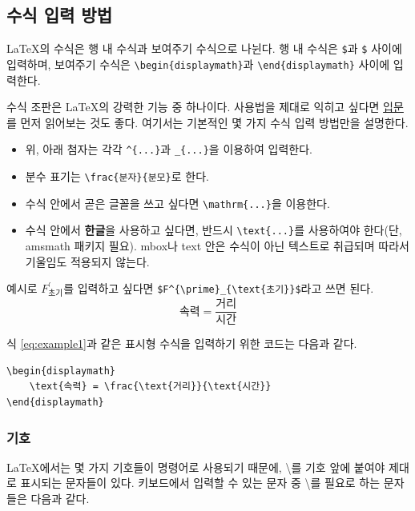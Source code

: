 \documentclass[11pt]{article}
\newcommand{\lshort}{%
	\href{http://texdoc.net/texmf-dist/doc/latex/%
		lshort-korean/lshort-kr.pdf%
	}{\LaTeXe 입문}%
}
\begin{document}
\subsection{수식 입력 방법}
\LaTeX 의 수식은 행 내 수식과 보여주기 수식으로 나뉜다. 행 내 수식은 \verb|$|과 
\verb|$| 사이에 입력하며, 보여주기 수식은 
\verb|\begin{displaymath}|과 \verb|\end{displaymath}| 사이에 입력한다.

수식 조판은 \LaTeX 의 강력한 기능 중 하나이다. 사용법을 제대로 익히고 싶다면 
\lshort 를 먼저 읽어보는 것도 좋다.
여기서는 기본적인 몇 가지 수식 입력 방법만을 설명한다.

\begin{itemize}
	\item 위, 아래 첨자는 각각 \verb|^{...}|과 \verb|_{...}|을 이용하여 
	입력한다.
	\item 분수 표기는 \verb|\frac{분자}{분모}|로 한다.
	\item 수식 안에서 곧은 글꼴을 쓰고 싶다면 \verb|\mathrm{...}|을 
	이용한다.
	\item 수식 안에서 {\bf 한글}을 사용하고 싶다면, 반드시 
	\verb|\text{...}|를 사용하여야 한다(단, amsmath 패키지 필요). mbox나 
	text 안은 수식이 아닌 텍스트로 취급되며 따라서 
	기울임도 적용되지 않는다.
\end{itemize}

예시로 $F^{\prime}_{\text{초기}}$를 입력하고 싶다면 
\verb|$F^{\prime}_{\text{초기}}$|라고 쓰면 된다.
\begin{equation} \label{eq:example1}
	\text{속력} = \frac{\text{거리}}{\text{시간}}
\end{equation}

식 \ref{eq:example1}과 같은 표시형 수식을 입력하기 위한 코드는 다음과 같다.

\begin{verbatim}
\begin{displaymath}
	\text{속력} = \frac{\text{거리}}{\text{시간}}
\end{displaymath}
\end{verbatim}

\subsubsection{기호} \label{section_symbol}
\LaTeX 에서는 몇 가지 기호들이 명령어로 사용되기 때문에, \textbackslash 를 기호 
앞에 붙여야 제대로 표시되는 문자들이 있다. 키보드에서 입력할 수 있는 문자 중 
\textbackslash 를 필요로 하는 문자들은 다음과 같다.
\end{document}
